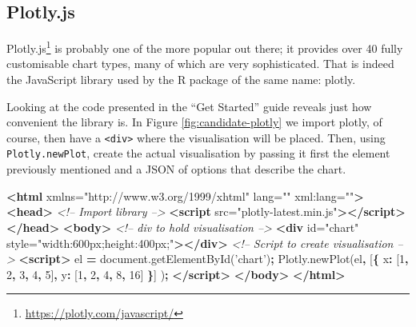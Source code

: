 \documentclass[10pt,]{krantz}
\makeatletter
\newenvironment{Shaded}{\begin{snugshade}}{\end{snugshade}}
\newcommand{\AttributeTok}[1]{\textcolor[rgb]{0.61,0.61,0.61}{#1}}
\newcommand{\CommentTok}[1]{\textcolor[rgb]{0.37,0.37,0.37}{\textit{#1}}}
\newcommand{\DataTypeTok}[1]{\textcolor[rgb]{0.27,0.27,0.27}{#1}}
\newcommand{\DecValTok}[1]{\textcolor[rgb]{0.06,0.06,0.06}{#1}}
\newcommand{\KeywordTok}[1]{\textcolor[rgb]{0.27,0.27,0.27}{\textbf{#1}}}
\newcommand{\NormalTok}[1]{#1}
\newcommand{\OperatorTok}[1]{\textcolor[rgb]{0.43,0.43,0.43}{\textbf{#1}}}
\newcommand{\OtherTok}[1]{\textcolor[rgb]{0.37,0.37,0.37}{#1}}
\newcommand{\StringTok}[1]{\textcolor[rgb]{0.5,0.5,0.5}{#1}}
\newcommand{\VariableTok}[1]{\textcolor[rgb]{0,0,0}{#1}}
\renewcommand{\href}[2]{#2\footnote{\url{#1}}}
\newenvironment{kframe}{%
\medskip{}
\setlength{\fboxsep}{.8em}
 \def\at@end@of@kframe{}%
 \ifinner\ifhmode%
  \def\at@end@of@kframe{\end{minipage}}%
  \begin{minipage}{\columnwidth}%
 \fi\fi%
 \def\FrameCommand##1{\hskip\@totalleftmargin \hskip-\fboxsep
 \colorbox{shadecolor}{##1}\hskip-\fboxsep
     \hskip-\linewidth \hskip-\@totalleftmargin \hskip\columnwidth}%
 \MakeFramed {\advance\hsize-\width
   \@totalleftmargin\z@ \linewidth\hsize
   \@setminipage}}%
 {\par\unskip\endMakeFramed%
 \at@end@of@kframe}
\renewenvironment{Shaded}{\begin{kframe}}{\end{kframe}}
\makeatother
\begin{document}
\hypertarget{widgets-basics-candidates-plotly}{%
\subsection{Plotly.js}\label{widgets-basics-candidates-plotly}}

\href{https://plotly.com/javascript/}{Plotly.js} is probably one of the more popular out there; it provides over 40 fully customisable chart types, many of which are very sophisticated. That is indeed the JavaScript library used by the R package of the same name: plotly.

Looking at the code presented in the ``Get Started'' guide reveals just how convenient the library is. In Figure \ref{fig:candidate-plotly} we import plotly, of course, then have a \texttt{\textless{}div\textgreater{}} where the visualisation will be placed. Then, using \texttt{Plotly.newPlot}, create the actual visualisation by passing it first the element previously mentioned and a JSON of options that describe the chart.

\begin{Shaded}
\begin{Highlighting}[]
\KeywordTok{<html}\OtherTok{ xmlns=}\StringTok{"http://www.w3.org/1999/xhtml"}\OtherTok{ lang=}\StringTok{""}\OtherTok{ xml:lang=}\StringTok{""}\KeywordTok{>}
\KeywordTok{<head>}
  \CommentTok{<!-- Import library -->}
  \KeywordTok{<script}\OtherTok{ src=}\StringTok{"plotly-latest.min.js"}\KeywordTok{></script>}
\KeywordTok{</head>}
\KeywordTok{<body>}
  \CommentTok{<!-- div to hold visualisation -->}
  \KeywordTok{<div}\OtherTok{ id=}\StringTok{"chart"}\OtherTok{ style=}\StringTok{"width:600px;height:400px;"}\KeywordTok{></div>}
  \CommentTok{<!-- Script to create visualisation -->}
  \KeywordTok{<script>}
\NormalTok{    el }\OperatorTok{=} \VariableTok{document}\NormalTok{.}\AttributeTok{getElementById}\NormalTok{(}\StringTok{'chart'}\NormalTok{)}\OperatorTok{;}
    \VariableTok{Plotly}\NormalTok{.}\AttributeTok{newPlot}\NormalTok{(el}\OperatorTok{,}\NormalTok{ [}\OperatorTok{\{}
      \DataTypeTok{x}\OperatorTok{:}\NormalTok{ [}\DecValTok{1}\OperatorTok{,} \DecValTok{2}\OperatorTok{,} \DecValTok{3}\OperatorTok{,} \DecValTok{4}\OperatorTok{,} \DecValTok{5}\NormalTok{]}\OperatorTok{,}
      \DataTypeTok{y}\OperatorTok{:}\NormalTok{ [}\DecValTok{1}\OperatorTok{,} \DecValTok{2}\OperatorTok{,} \DecValTok{4}\OperatorTok{,} \DecValTok{8}\OperatorTok{,} \DecValTok{16}\NormalTok{] }\OperatorTok{\}}\NormalTok{]}
\NormalTok{    )}\OperatorTok{;}
  \KeywordTok{</script>}
\KeywordTok{</body>}
\KeywordTok{</html>}
\end{Highlighting}
\end{Shaded}
\end{document}
